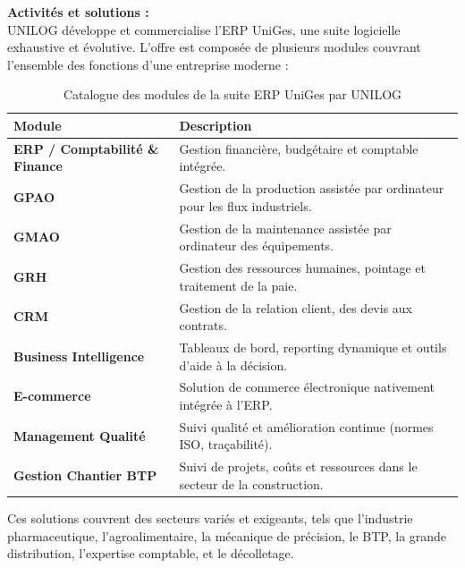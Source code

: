﻿\documentclass[12pt,a4paper,oneside]{report} %
\begin{document}
\textbf{Activités et solutions :}\\
UNILOG développe et commercialise l'ERP UniGes, une suite logicielle exhaustive et évolutive. L'offre est composée de plusieurs modules couvrant l'ensemble des fonctions d'une entreprise moderne :

\begin{table}[H]
\centering
\begin{tabularx}{\textwidth}{|l|X|}
\hline
\textbf{Module} & \textbf{Description} \\ \hline
\textbf{ERP / Comptabilité \& Finance} & Gestion financière, budgétaire et comptable intégrée. \\ \hline
\textbf{GPAO} & Gestion de la production assistée par ordinateur pour les flux industriels. \\ \hline
\textbf{GMAO} & Gestion de la maintenance assistée par ordinateur des équipements. \\ \hline
\textbf{GRH} & Gestion des ressources humaines, pointage et traitement de la paie. \\ \hline
\textbf{CRM} & Gestion de la relation client, des devis aux contrats. \\ \hline
\textbf{Business Intelligence} & Tableaux de bord, reporting dynamique et outils d'aide à la décision. \\ \hline
\textbf{E-commerce} & Solution de commerce électronique nativement intégrée à l'ERP. \\ \hline
\textbf{Management Qualité} & Suivi qualité et amélioration continue (normes ISO, traçabilité). \\ \hline
\textbf{Gestion Chantier BTP} & Suivi de projets, coûts et ressources dans le secteur de la construction. \\ \hline
\end{tabularx}
\caption{Catalogue des modules de la suite ERP UniGes par UNILOG}
\end{table}

Ces solutions couvrent des secteurs variés et exigeants, tels que l'industrie pharmaceutique, l'agroalimentaire, la mécanique de précision, le BTP, la grande distribution, l'expertise comptable, et le décolletage.
\end{document}
